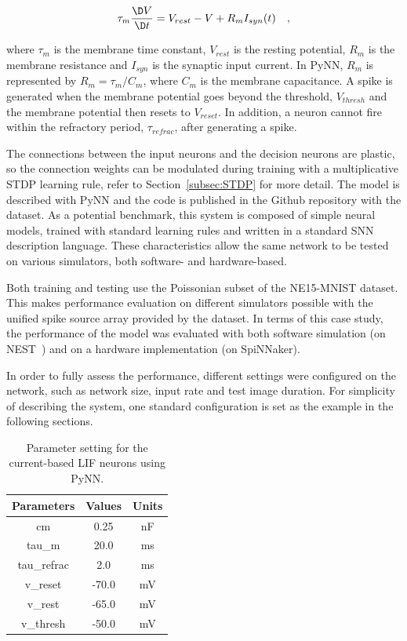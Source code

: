 \begin{equation}
\tau_m \frac{\D V}{\D t}=V_{rest} - V + R_{m} I_{syn}(t) ~~~,
\label{eq:LIF}
\end{equation}

where $\tau_m$ is the membrane time constant, $ V_{rest} $ is the resting potential, $ R_{m} $ is the membrane resistance and $ I_{syn} $ is the synaptic input current.
In PyNN, $ R_{m} $ is  represented by $ R_{m}=\tau_m/C_{m} $, where $C_{m} $ is the membrane capacitance.
A spike is generated when the membrane potential goes beyond the threshold, $ V_{thresh} $ and the membrane potential then resets to $V_{reset}$.
In addition, a neuron cannot fire within the refractory period, $ \tau_{refrac} $, after generating a spike.

The connections between the input neurons and the decision neurons are plastic, so the connection weights can be modulated during training with a multiplicative STDP learning rule,  refer to Section~\ref{subsec:STDP} for more detail.
The model is described with PyNN and the code is published in
the Github repository with the dataset.
As a potential benchmark, this system is composed of simple neural models, trained with standard learning rules and written in a standard SNN description language. These characteristics allow the same network to be tested on various simulators, both software- and hardware-based.

Both training and testing use the Poissonian subset of the NE15-MNIST dataset.
This makes performance evaluation on different simulators possible with the unified spike source array provided by the dataset. 
In terms of this case study, the performance of the model was evaluated with both software simulation (on NEST~\citep{gewaltig2007nest}) and on a hardware implementation (on SpiNNaker).

In order to fully assess the performance, different settings were configured on the network, such as network size, input rate and test image duration.
For simplicity of describing the system, one standard configuration is set as the example in the following sections.

\begin{table}[hbbp]
	\centering
	\caption{\label{tbl:pynnSetting}Parameter setting for the current-based LIF neurons using PyNN.}
	\bgroup
	\def\arraystretch{1.4}
	\begin{tabular}{c c c}
		Parameters & Values & Units \\
		\hline
		cm & 0.25 & nF	\\
		tau\_m & 20.0 & ms\\
		tau\_refrac & 2.0 & ms\\
		v\_reset & -70.0 & mV\\
		v\_rest & -65.0 & mV\\
		v\_thresh & -50.0 & mV\\
		\end{tabular}
	\egroup
\end{table}

